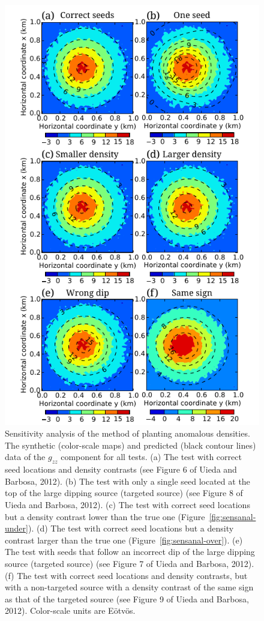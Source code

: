\documentclass[twocolumn]{article}
\begin{document}
\begin{figure}[]
    \includegraphics{fig/sensitivity-fit}
    \caption{      
    Sensitivity analysis of the method of planting anomalous densities.
    The synthetic (color-scale maps) and
    predicted (black contour lines) data
    of the $g_{zz}$ component
    for all tests.
    (a) The test with correct seed locations and density contrasts
        (see Figure 6 of Uieda and Barbosa, 2012).
    (b) The test with only a single seed
        located at the top of the large dipping source (targeted source)
        (see Figure 8 of Uieda and Barbosa, 2012).
    (c) The test with correct seed locations
        but a density contrast lower than the true one
        (Figure~\ref{fig:sensanal-under}).
    (d) The test with correct seed locations
        but a density contrast larger than the true one
        (Figure~\ref{fig:sensanal-over}).
    (e) The test with seeds
        that follow an incorrect dip of
        the large dipping source (targeted source)
        (see Figure 7 of Uieda and Barbosa, 2012).
    (f) The test with correct seed locations and density contrasts,
        but with a non-targeted source with a density contrast
        of the same sign as that of the targeted source
        (see Figure 9 of Uieda and Barbosa, 2012).
    Color-scale units are E\"otv\"os.
    \label{fig:sensanal-fit}}
\end{figure}
\end{document}
